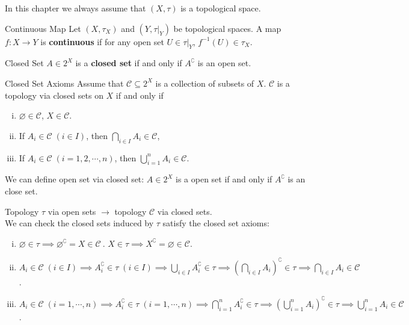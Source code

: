 \documentclass{report}
\begin{document}
\noindent In this chapter we always assume that $(X,\tau)$ is a topological space.

\begin{definition}{Continuous Map}{}
	Let $(X,\tau_X)$ and $(Y,\tau |_Y)$ be topological spaces. A map $f:X\to Y$ is \textbf{continuous} if for any open set $U\in\tau |_Y$, $f^{-1}(U)\in\tau_X$.
\end{definition}



\begin{definition}{Closed Set}{}
	$A\in 2^X$ is a \textbf{closed set} if and only if $A^{\complement}$ is an open set.
\end{definition}

\begin{definition}{Closed Set Axioms}{}
	Assume that $\mathcal{C}\subseteq2^X $ is a collection of subsets of $X$. $\mathcal{C}$ is a topology via closed sets on $X$ if and only if
	\begin{enumerate}[(i)]
		\item $\varnothing\in \mathcal{C}$, $X\in \mathcal{C}$.
		\item If $A_i\in\mathcal{C}\;(i\in I)$, then $\bigcap\limits_{i\in I}A_i\in \mathcal{C}$,
		\item If $A_i\in\mathcal{C}\;(i=1,2,\cdots,n)$, then $\bigcup\limits_{i=1}^nA_i\in \mathcal{C}$.
	\end{enumerate}
	We can define open set via closed set: $A\in 2^X$ is a open set if and only if $A^{\complement}$ is an close set.
\end{definition}


\begin{prf}
	Topology $\tau$ via open sets $\rightarrow$ topology $\mathcal{C}$ via closed sets.\\
	We can check the closed sets induced by $\tau$ satisfy the closed set axioms:
	\begin{enumerate}[(i)]
		\item $\varnothing\in \tau\implies\varnothing^{\complement}=X\in \mathcal{C} \ $. $X\in \tau\implies X^{\complement}=\varnothing\in \mathcal{C}$.
		\item $A_i\in\mathcal{C}\;(i\in I)\implies A_i^{\complement}\in\tau\;(i\in I)\implies\bigcup\limits_{i\in I}A_i^{\complement}\in \tau\implies \left(\bigcap\limits_{i\in I}A_i\right)^{\complement}\in \tau\implies\bigcap\limits_{i\in I}A_i\in\mathcal{C}$.
		\item $A_i\in\mathcal{C}\;(i=1,\cdots,n)\implies A_i^{\complement}\in\tau\;(i=1,\cdots,n)\implies\bigcap\limits_{i=1}^nA_i^{\complement}\in \tau\implies \left(\bigcup\limits_{i=1}^nA_i\right)^{\complement}\in \tau\implies\bigcup\limits_{i=1}^nA_i\in\mathcal{C}$.
	\end{enumerate}
\end{prf}
\end{document}
